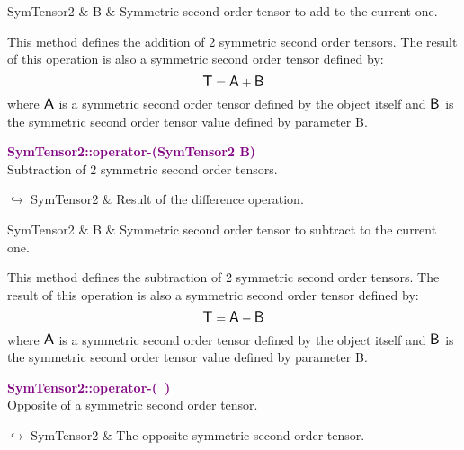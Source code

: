 \begin{tcolorbox}[width=\textwidth,myArgs,tabularx={ll|R}]
SymTensor2 & B & Symmetric second order tensor to add to the current one.
\end{tcolorbox}

This method defines the addition of 2 symmetric second order tensors.
The result of this operation is also a symmetric second order tensor defined by:
\begin{equation*}
\mbox{\large\ensuremath{\mathsf{T}}} = \mbox{\large\ensuremath{\mathsf{A}}} + \mbox{\large\ensuremath{\mathsf{B}}}
\end{equation*}
where $\mbox{\large\ensuremath{\mathsf{A}}}$ is a symmetric second order tensor defined by the object itself and $\mbox{\large\ensuremath{\mathsf{B}}}$ is the symmetric second order tensor value defined by parameter B.

\textcolor{purple}{\textbf{SymTensor2::operator-(SymTensor2 B)}}\label{SymTensor2::operator-(SymTensor2 B)}\\
Subtraction of 2 symmetric second order tensors.\vspace*{-0.5em}
\begin{tcolorbox}[grow to left by=-1cm, width=\textwidth-1cm,myArgs,tabularx={l|R}]
$\hookrightarrow$ SymTensor2 & Result of the difference operation.
\end{tcolorbox}

\begin{tcolorbox}[width=\textwidth,myArgs,tabularx={ll|R}]
SymTensor2 & B & Symmetric second order tensor to subtract to the current one.
\end{tcolorbox}

This method defines the subtraction of 2 symmetric second order tensors.
The result of this operation is also a symmetric second order tensor defined by:
\begin{equation*}
\mbox{\large\ensuremath{\mathsf{T}}} = \mbox{\large\ensuremath{\mathsf{A}}} - \mbox{\large\ensuremath{\mathsf{B}}}
\end{equation*}
where $\mbox{\large\ensuremath{\mathsf{A}}}$ is a symmetric second order tensor defined by the object itself and $\mbox{\large\ensuremath{\mathsf{B}}}$ is the symmetric second order tensor value defined by parameter B.

\textcolor{purple}{\textbf{SymTensor2::operator-(~)}}\label{SymTensor2::operator-()}\\
Opposite of a symmetric second order tensor.\vspace*{-0.5em}
\begin{tcolorbox}[grow to left by=-1cm, width=\textwidth-1cm,myArgs,tabularx={l|R}]
$\hookrightarrow$ SymTensor2 & The opposite symmetric second order tensor.
\end{tcolorbox}

